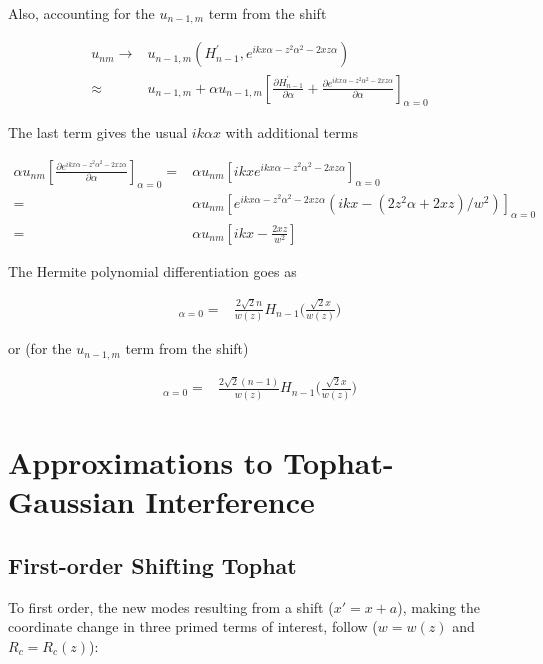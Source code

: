 \documentclass[aps,twoside,secnumarabic,balancelastpage,amsmath,amssymb,nofootinbib,hyperref=pdftex]{revtex4}
\begin{document}
Also, accounting for the $u_{n-1,m}$ term from the shift

\begin{align*}
	u_{nm} \rightarrow&
	u_{n-1,m} (H_{n-1}^{'}, e^{ikx\alpha-z^2\alpha^2 - 2xz\alpha})
	\\ \approx &
	u_{n-1,m} + \alpha u_{n-1,m}[ \frac{\partial  H_{n-1}^{'} }{\partial\alpha}   + \frac{\partial e^{ikx\alpha-z^2\alpha^2 - 2xz\alpha}}{\partial \alpha} ]_{\alpha=0}
\end{align*}

The last term gives the usual $ik\alpha x$ with additional terms

\begin{align*}
	\alpha u_{nm}[\frac{\partial e^{ikx\alpha-z^2\alpha^2 - 2xz\alpha}}{\partial \alpha}]_{\alpha=0}
	=&
	\alpha u_{nm}[ikx e^{ikx\alpha-z^2\alpha^2 - 2xz\alpha}]_{\alpha=0}
	\\=& \alpha u_{nm} [e^{ikx\alpha-z^2\alpha^2 - 2xz\alpha}(ikx-(2 z^2\alpha + 2xz)/w^2)]_{\alpha=0}
	\\=&
	\alpha u_{nm} [ikx- \frac{2xz}{w^2}]
\end{align*}

The Hermite polynomial differentiation goes as

\begin{align*}
	[\frac{\partial H_n(\frac{\sqrt{2}(x+\alpha) }{w(z)})}{\partial x}]_{\alpha=0}
	=&
	\frac{2 \sqrt{2} n}{w(z)} H_{n-1}\Big(\frac{\sqrt{2}x}{w(z)}\Big)
\end{align*}

or (for the $u_{n-1,m}$ term from the shift)

\begin{align*}
	[\frac{\partial H_{n-1}(\frac{\sqrt{2}(x+\alpha) }{w(z)})}{\partial x}]_{\alpha=0}
	=&
	\frac{2 \sqrt{2} (n-1)}{w(z)} H_{n-1}\Big(\frac{\sqrt{2}x}{w(z)}\Big)
\end{align*}

\section{Approximations to Tophat-Gaussian Interference}

\subsection{First-order Shifting Tophat}

 To first order, the new modes resulting from a shift ($x' = x+a$), making the coordinate change in three primed terms of interest, follow ($w=w(z)$ and $R_c=R_c(z)$):
\end{document}
